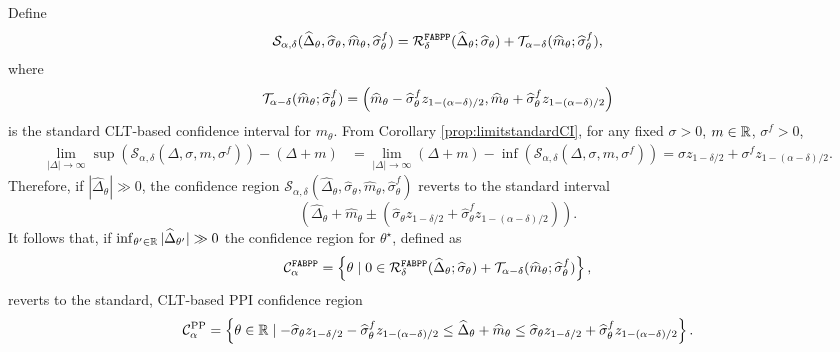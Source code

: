 Define
\begin{align}
    \mathcal S_{\alpha,\delta}(\widehat\Delta_\theta, \widehat{\sigma}_\theta, \widehat m_\theta, \widehat\sigma_\theta^f)
    =\mathcal R^{\mathrm{\texttt{FABPP}}}_\delta(\widehat\Delta_\theta; \widehat{\sigma}_\theta) + \mathcal T_{\alpha-\delta}(\widehat m_\theta; \widehat\sigma_\theta^f),
\end{align}
where
$$
    \mathcal T_{\alpha-\delta}(\widehat m_\theta; \widehat\sigma_\theta^f)
    = \left(\widehat{m}_\theta - \widehat\sigma_\theta^f z_{1-(\alpha - \delta) / 2}, \widehat{m}_\theta + \widehat\sigma_\theta^f  z_{1-(\alpha - \delta) / 2}\right)
$$
is the standard CLT-based confidence interval for $m_\theta$. From Corollary \ref{prop:limitstandardCI}, for any fixed $\sigma>0$, $m\in\mathbb R$, $\sigma^f>0$,
\begin{align*}
    \lim_{|\Delta|\to\infty} \sup(\mathcal S_{\alpha,\delta}(\Delta, \sigma, m, \sigma^f)) - (\Delta+m) &=\lim_{|\Delta|\to\infty} (\Delta+m)-\inf(\mathcal S_{\alpha,\delta}(\Delta, \sigma, m, \sigma^f))=\sigma z_{1-\delta/2} + \sigma^f z_{1-(\alpha-\delta)/2}.
\end{align*}
Therefore, if $|\widehat{\Delta}_\theta|\gg 0$, the confidence region $\mathcal S_{\alpha,\delta}(\widehat\Delta_\theta, \widehat{\sigma}_\theta, \widehat m_\theta, \widehat\sigma_\theta^f)$ reverts to the standard interval 
$$
    (\widehat\Delta_\theta+\widehat m_\theta \pm (\widehat{\sigma}_\theta z_{1-\delta/2}+ \widehat{\sigma}^f_\theta z_{1-(\alpha-\delta)/2}) ).
$$
It follows that, if $\inf_{\theta'\in\mathbb R} |\widehat\Delta_{\theta'}|\gg 0$  the confidence region for $\theta^\star$, defined as
\begin{equation*}
    \mathcal C_\alpha^{\mathrm{\texttt{FABPP}}}=\left\{\theta \mid 0\in \mathcal R^{\mathrm{\texttt{FABPP}}}_\delta(\widehat\Delta_\theta; \widehat{\sigma}_\theta) + \mathcal T_{\alpha-\delta}(\widehat m_\theta; \widehat\sigma_\theta^f)\right\},
\end{equation*}    
reverts to the standard, CLT-based PPI confidence region
\begin{equation*}
    \mathcal C_\alpha^\text{PP}=\left\{\theta\in\mathbb R \mid  -\widehat{\sigma}_\theta z_{1-\delta/2}- \widehat{\sigma}^f_\theta z_{1-(\alpha-\delta)/2}  \leq \widehat\Delta_\theta+\widehat m_\theta\leq  \widehat{\sigma}_\theta z_{1-\delta/2}+ \widehat{\sigma}^f_\theta z_{1-(\alpha-\delta)/2}           \right\}.
\end{equation*}


